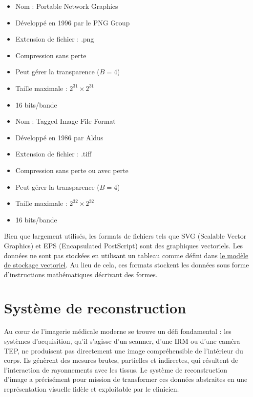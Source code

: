 \begin{description}[leftmargin=!, labelwidth=\widthof{\bfseries JPEG 2000}]
    \item[PNG] 
        \begin{itemize}
            \item Nom : Portable Network Graphics
            \item Développé en 1996 par le PNG Group
            \item Extension de fichier : .png
            \item Compression sans perte
            \item Peut gérer la transparence (\( B = 4 \))
            \item Taille maximale : \( 2^{31} \times 2^{31} \)
            \item 16 bits/bande
        \end{itemize}
        
    \item[TIFF] 
        \begin{itemize}
            \item Nom : Tagged Image File Format
            \item Développé en 1986 par Aldus
            \item Extension de fichier : .tiff
            \item Compression sans perte ou avec perte
            \item Peut gérer la transparence (\( B = 4 \))
            \item Taille maximale : \( 2^{32} \times 2^{32} \)
            \item 16 bits/bande
        \end{itemize}
\end{description}
Bien que largement utilisés, les formats de fichiers tels que SVG (Scalable Vector Graphics) et EPS (Encapsulated PostScript) sont des graphiques vectoriels. Les données ne sont pas stockées en utilisant un tableau comme défini dans \href{https://en.wikipedia.org/wiki/Data_storage_model#Vector_data_storage}{le modèle de stockage vectoriel}. Au lieu de cela, ces formats stockent les données sous forme d'instructions mathématiques décrivant des formes.

\section{Système de reconstruction}
Au cœur de l'imagerie médicale moderne se trouve un défi fondamental : les systèmes d'acquisition, qu'il s'agisse d'un scanner, d'une IRM ou d'une caméra TEP, ne produisent pas directement une image compréhensible de l'intérieur du corps. Ils génèrent des mesures brutes, partielles et indirectes, qui résultent de l'interaction de rayonnements avec les tissus. Le système de reconstruction d'image a précisément pour mission de transformer ces données abstraites en une représentation visuelle fidèle et exploitable par le clinicien.


